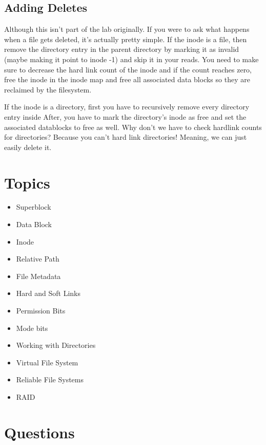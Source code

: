 \subsection{Adding Deletes}

Although this isn't part of the lab originally.
If you were to ask what happens when a file gets deleted, it's actually pretty simple.
If the inode is a file, then remove the directory entry in the parent directory by marking it as invalid (maybe making it point to inode -1) and skip it in your reads.
You need to make sure to decrease the hard link count of the inode and if the count reaches zero, free the inode in the inode map and free all associated data blocks so they are reclaimed by the filesystem.

If the inode is a directory, first you have to recursively remove every directory entry inside
After, you have to mark the directory's inode as free and set the associated datablocks to free as well.
Why don't we have to check hardlink counts for directories?
Because you can't hard link directories! Meaning, we can just easily delete it.

\section{Topics}\label{topics}

\begin{itemize}
\tightlist
\item
  Superblock
\item
  Data Block
\item
  Inode
\item
  Relative Path
\item
  File Metadata
\item
  Hard and Soft Links
\item
  Permission Bits
\item
  Mode bits
\item
  Working with Directories
\item
  Virtual File System
\item
  Reliable File Systems
\item
  RAID
\end{itemize}

\section{Questions}\label{questions}

